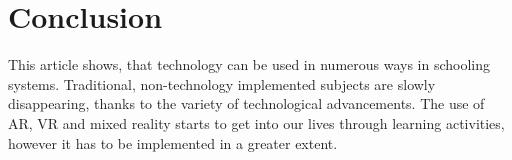 \documentclass[10pt,oneside,english,a4paper]{article}
\begin{document}
\section{Conclusion}

	This article shows, that technology can be used in numerous ways in schooling systems. Traditional, non-technology implemented subjects are slowly disappearing, thanks to the variety of technological advancements. The use of AR, VR and mixed reality starts to get into our lives through learning activities, however it has to be implemented in a greater extent.






\end{document}
